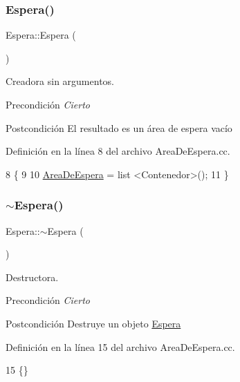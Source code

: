 \subsubsection{\texorpdfstring{Espera()}{Espera()}}
{\footnotesize\ttfamily Espera\+::\+Espera (\begin{DoxyParamCaption}{ }\end{DoxyParamCaption})}



Creadora sin argumentos. 

\begin{DoxyPrecond}{Precondición}
{\itshape Cierto} 
\end{DoxyPrecond}
\begin{DoxyPostcond}{Postcondición}
El resultado es un área de espera vacío 
\end{DoxyPostcond}


Definición en la línea 8 del archivo Area\+De\+Espera.\+cc.


\begin{DoxyCode}
8                \{
9     
10     \hyperlink{class_espera_adafca5e22c5bc21e517b363144fc6b18}{AreaDeEspera} = list <Contenedor>();
11 \}
\end{DoxyCode}
\mbox{\label{class_espera_a970b7c780ad48f158c408586d4b3b4b3}} 
\subsubsection{\texorpdfstring{$\sim$\+Espera()}{~Espera()}}
{\footnotesize\ttfamily Espera\+::$\sim$\+Espera (\begin{DoxyParamCaption}{ }\end{DoxyParamCaption})}



Destructora. 

\begin{DoxyPrecond}{Precondición}
{\itshape Cierto} 
\end{DoxyPrecond}
\begin{DoxyPostcond}{Postcondición}
Destruye un objeto \hyperlink{class_espera}{Espera} 
\end{DoxyPostcond}


Definición en la línea 15 del archivo Area\+De\+Espera.\+cc.


\begin{DoxyCode}
15 \{\}
\end{DoxyCode}


